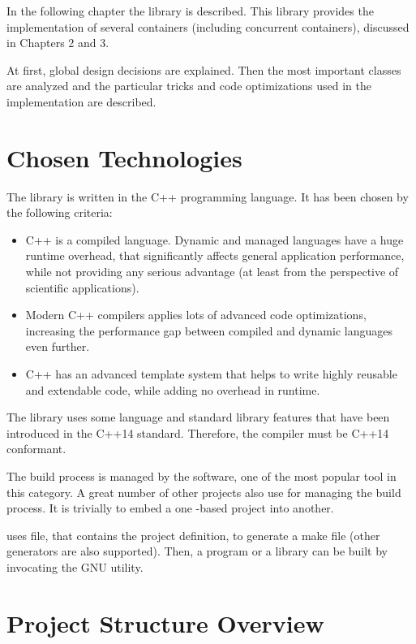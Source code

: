 In the following chapter the \numdbname library is described. This library provides the implementation of several containers (including concurrent containers), discussed in Chapters
2 and 3.

At first, global design decisions are explained. Then the most important classes are analyzed and the particular tricks and code optimizations used in the implementation are described.

\section{Chosen Technologies}

The library is written in the C++ programming language. It has been chosen by the following criteria:
\begin{itemize}
\item C++ is a compiled language. Dynamic and managed languages have a huge runtime overhead, that significantly affects general application performance, while not providing any serious advantage (at least from the perspective of scientific applications).
\item Modern C++ compilers applies lots of advanced code optimizations, increasing the performance gap between compiled and dynamic languages even further.
\item C++ has an advanced template system that helps to write highly reusable and extendable code, while adding no overhead in runtime.
\end{itemize}
The library uses some language and standard library features that have been introduced in the C++14 standard. Therefore, the compiler must be C++14 conformant.

The build process is managed by the  software, one of the most popular tool in this category. A great number of other projects also use  for managing the build process. It is trivially to embed a one -based project into another.

 uses  file, that contains the project definition, to generate a make file (other generators are also supported). Then, a program or a library can be built by invocating the GNU  utility.

\section{Project Structure Overview}


